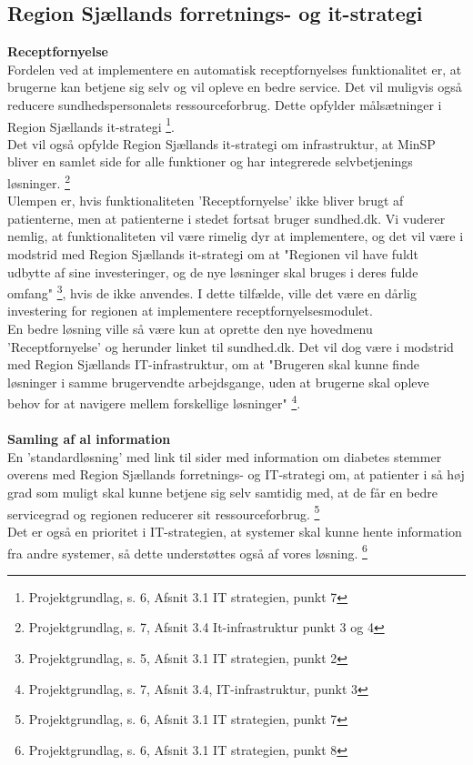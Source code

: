 \subsection{Region Sjællands forretnings- og it-strategi}
\textbf{Receptfornyelse}\\
Fordelen ved at implementere en automatisk receptfornyelses funktionalitet er, at brugerne kan betjene sig selv og vil opleve en bedre service. Det vil muligvis også reducere sundhedspersonalets ressourceforbrug. Dette opfylder målsætninger i Region Sjællands it-strategi \footnote{Projektgrundlag, s. 6, Afsnit 3.1 IT strategien, punkt 7 }.\\
Det vil også opfylde Region Sjællands it-strategi om infrastruktur, at MinSP bliver en samlet side for alle funktioner og har integrerede selvbetjenings løsninger. \footnote{Projektgrundlag, s. 7, Afsnit 3.4 It-infrastruktur punkt 3 og 4}\\
Ulempen er, hvis funktionaliteten 'Receptfornyelse' ikke bliver brugt af patienterne, men at patienterne i stedet fortsat bruger sundhed.dk. Vi vuderer nemlig, at funktionaliteten vil være rimelig dyr at implementere, og det vil være i modstrid med Region Sjællands it-strategi om at "Regionen vil have fuldt udbytte af sine investeringer, og de nye løsninger skal bruges i deres fulde omfang" \footnote{Projektgrundlag, s. 5, Afsnit 3.1 IT strategien, punkt 2}, hvis de ikke anvendes. I dette tilfælde, ville det være en dårlig investering for regionen at implementere receptfornyelsesmodulet.\\ 
En bedre løsning ville så være kun at oprette den nye hovedmenu 'Receptfornyelse' og herunder linket til sundhed.dk. Det vil dog være i modstrid med Region Sjællands IT-infrastruktur, om at "Brugeren skal kunne finde løsninger i samme brugervendte arbejdsgange, uden at brugerne skal opleve behov for at navigere mellem forskellige løsninger" \footnote{Projektgrundlag, s. 7, Afsnit 3.4, IT-infrastruktur, punkt 3}. 
\\\\
\textbf{Samling af al information}\\
En 'standardløsning' med link til sider med information om diabetes stemmer overens med Region Sjællands forretnings- og IT-strategi om, at patienter i så høj grad som muligt skal kunne betjene sig selv samtidig med, at de får en bedre servicegrad og regionen reducerer sit ressourceforbrug. \footnote{Projektgrundlag, s. 6, Afsnit 3.1 IT strategien, punkt 7} \\
Det er også en prioritet i IT-strategien, at systemer skal kunne hente information fra andre systemer, så dette understøttes også af vores løsning. \footnote{Projektgrundlag, s. 6, Afsnit 3.1 IT strategien, punkt 8} \\
